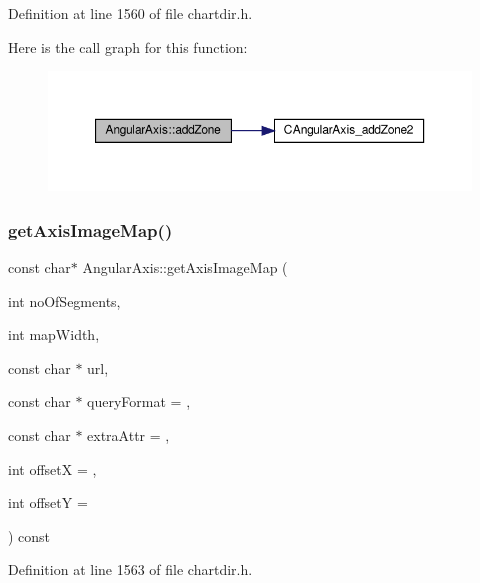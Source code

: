 Definition at line 1560 of file chartdir.\+h.

Here is the call graph for this function\+:
\nopagebreak
\begin{figure}[H]
\begin{center}
\leavevmode
\includegraphics[width=350pt]{class_angular_axis_a53f7a154799715aa97d16d5140a7de17_cgraph}
\end{center}
\end{figure}
\mbox{\label{class_angular_axis_a6d9609544b763a5af1f6eb4e24165ea6}} 
\subsubsection{\texorpdfstring{get\+Axis\+Image\+Map()}{getAxisImageMap()}}
{\footnotesize\ttfamily const char$\ast$ Angular\+Axis\+::get\+Axis\+Image\+Map (\begin{DoxyParamCaption}\item[{int}]{no\+Of\+Segments,  }\item[{int}]{map\+Width,  }\item[{const char $\ast$}]{url,  }\item[{const char $\ast$}]{query\+Format = {},  }\item[{const char $\ast$}]{extra\+Attr = {},  }\item[{int}]{offsetX = {},  }\item[{int}]{offsetY = {} }\end{DoxyParamCaption}) const\hspace{0.3cm}{\ttfamily [inline]}}



Definition at line 1563 of file chartdir.\+h.

